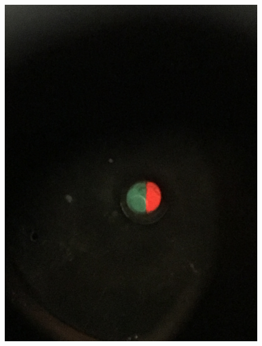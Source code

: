 \begin{figure}[h!]
\begin{minipage}{0.25\linewidth}
		\includegraphics[width=\linewidth]{biquarz/blue-red.jpg}
	\end{minipage}
	\begin{minipage}{0.25\linewidth}

\end{minipage}
\end{figure}
